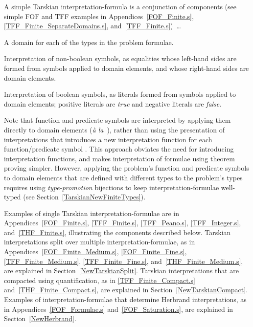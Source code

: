 \documentclass{easychair}
\newenvironment{packed_itemize}{
\vspace*{-0.3em}
\begin{itemize}
\setlength{\partopsep}{0pt}
\setlength{\itemsep}{1pt}
\setlength{\parskip}{0pt}
\setlength{\parsep}{0pt}
}{\end{itemize}}
\begin{document}
A simple Tarskian interpretation-formula is a conjunction of components (see simple FOF and TFF
examples in Appendices~\ref{FOF_Finite.s}, \ref{TFF_Finite_SeparateDomains.s}, 
and~\ref{TFF_Finite.s})~\ldots
\begin{packed_itemize}
\item A domain for each of the types in the problem formulae.
\item Interpretation of non-boolean symbols, as equalities whose left-hand sides are formed from 
      symbols applied to domain elements, and whose right-hand sides are domain elements.
\item Interpretation of boolean symbols, as literals formed from symbols applied to domain 
      elements; positive literals are \emph{true} and negative literals are \emph{false}.
\end{packed_itemize}

Note that function and predicate symbols are interpreted by applying them directly to domain
elements (\emph{{\`a} la}~\cite[\S5.3.4]{Gal15}), rather than using the presentation of 
interpretations that introduces a new interpretation function for each function/predicate symbol 
\cite[\S5.3.2]{Gal15}.
This approach obviates the need for introducing interpretation functions, and makes 
interpretation of formulae using theorem proving simpler.
However, applying the problem's function and predicate symbols to domain elements that are 
defined with different types to the problem's types requires using \emph{type-promotion} 
bijections to keep interpretation-formulae well-typed (see Section~\ref{TarskianNewFiniteTypes}).

Examples of single Tarskian interpretation-formulae are in Appendices~\ref{FOF_Finite.s}, 
\ref{TFF_Finite.s}, \ref{TFF_Peano.s}, \ref{TFF_Integer.s}, and~\ref{THF_Finite.s}, illustrating 
the components described below. 
Tarskian interpretations split over multiple interpretation-formulae, as in 
Appendices~\ref{FOF_Finite_Medium.s}, \ref{FOF_Finite_Fine.s}, \ref{TFF_Finite_Medium.s}, 
\ref{TFF_Finite_Fine.s}, and~\ref{THF_Finite_Medium.s}, are explained in 
Section~\ref{NewTarskianSplit}.
Tarskian interpretations that are compacted using quantification, as in \ref{TFF_Finite_Compact.s}
and~\ref{THF_Finite_Compact.s}, are explained in Section~\ref{NewTarskianCompact}.
Examples of interpretation-formulae that determine Herbrand interpretations, as in 
Appendices~\ref{FOF_Formulae.s} and~\ref{FOF_Saturation.s}, are explained in 
Section~\ref{NewHerbrand}.
\end{document}
